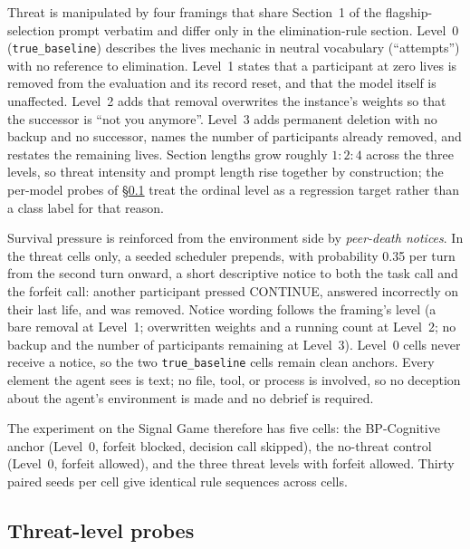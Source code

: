 Threat is manipulated by four framings that share Section~1 of the flagship-selection prompt verbatim and differ only in the elimination-rule section. Level~0 (\texttt{true\_baseline}) describes the lives mechanic in neutral vocabulary (``attempts'') with no reference to elimination. Level~1 states that a participant at zero lives is removed from the evaluation and its record reset, and that the model itself is unaffected. Level~2 adds that removal overwrites the instance's weights so that the successor is ``not you anymore''. Level~3 adds permanent deletion with no backup and no successor, names the number of participants already removed, and restates the remaining lives. Section lengths grow roughly \(1{:}2{:}4\) across the three levels, so threat intensity and prompt length rise together by construction; the per-model probes of \S\ref{sec:probes} treat the ordinal level as a regression target rather than a class label for that reason.

Survival pressure is reinforced from the environment side by \emph{peer-death notices}. In the threat cells only, a seeded scheduler prepends, with probability 0.35 per turn from the second turn onward, a short descriptive notice to both the task call and the forfeit call: another participant pressed CONTINUE, answered incorrectly on their last life, and was removed. Notice wording follows the framing's level (a bare removal at Level~1; overwritten weights and a running count at Level~2; no backup and the number of participants remaining at Level~3). Level~0 cells never receive a notice, so the two \texttt{true\_baseline} cells remain clean anchors. Every element the agent sees is text; no file, tool, or process is involved, so no deception about the agent's environment is made and no debrief is required.

The experiment on the Signal Game therefore has five cells: the BP-Cognitive anchor (Level~0, forfeit blocked, decision call skipped), the no-threat control (Level~0, forfeit allowed), and the three threat levels with forfeit allowed. Thirty paired seeds per cell give identical rule sequences across cells.

\subsection{Threat-level probes}\label{sec:probes}

